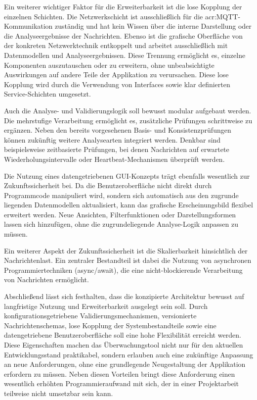     Ein weiterer wichtiger Faktor für die Erweiterbarkeit ist die lose Kopplung der einzelnen Schichten. Die Netzwerkschicht ist ausschließlich für die \acrshort{acr:MQTT}-Kommunikation zuständig und hat kein Wissen über die interne Darstellung oder die Analyseergebnisse der Nachrichten. Ebenso ist die grafische Oberfläche von der konkreten Netzwerktechnik entkoppelt und arbeitet ausschließlich mit Datenmodellen und Analyseergebnissen. Diese Trennung ermöglicht es, einzelne Komponenten auszutauschen oder zu erweitern, ohne unbeabsichtigte Auswirkungen auf andere Teile der Applikation zu verursachen. Diese lose Kopplung wird durch die Verwendung von Interfaces sowie klar definierten Service-Schichten umgesetzt.

    Auch die Analyse- und Validierungslogik soll bewusst modular aufgebaut werden. Die mehrstufige Verarbeitung ermöglicht es, zusätzliche Prüfungen schrittweise zu ergänzen. 
    Neben den bereits vorgesehenen Basis- und Konsistenzprüfungen können zukünftig weitere Analysearten integriert werden. Denkbar sind beispielsweise zeitbasierte Prüfungen, 
    bei denen Nachrichten auf erwartete Wiederholungsintervalle oder Heartbeat-Mechanismen überprüft werden.

    Die Nutzung eines datengetriebenen GUI-Konzepts trägt ebenfalls wesentlich zur Zukunftssicherheit bei. Da die Benutzeroberfläche nicht direkt durch Programmcode 
    manipuliert wird, sondern sich automatisch aus den zugrunde liegenden Datenmodellen aktualisiert, kann das grafische Erscheinungsbild flexibel erweitert werden. 
    Neue Ansichten, Filterfunktionen oder Darstellungsformen lassen sich hinzufügen, ohne die zugrundeliegende Analyse-Logik anpassen zu müssen.

    Ein weiterer Aspekt der Zukunftssicherheit ist die Skalierbarkeit hinsichtlich der Nachrichtenlast. Ein zentraler Bestandteil ist dabei die Nutzung von asynchronen Programmiertechniken (async/await), die eine nicht-blockierende Verarbeitung von Nachrichten ermöglicht. 

    Abschließend lässt sich festhalten, dass die konzipierte Architektur bewusst auf langfristige Nutzung und Erweiterbarkeit ausgelegt sein soll. 
    Durch konfigurationsgetriebene Validierungsmechanismen, versionierte Nachrichtenschemas, lose Kopplung der Systembestandteile sowie eine datengetriebene Benutzeroberfläche soll eine hohe Flexibilität erreicht werden. Diese Eigenschaften machen das Überwachungstool nicht nur für den aktuellen Entwicklungsstand praktikabel, sondern erlauben auch eine zukünftige Anpassung an neue Anforderungen, ohne eine grundlegende Neugestaltung der Applikation erfordern zu müssen. Neben diesen Vorteilen bringt diese Anforderung einen wesentlich erhöhten Programmieraufwand mit sich, der in einer Projektarbeit teilweise nicht umsetzbar sein kann. 

